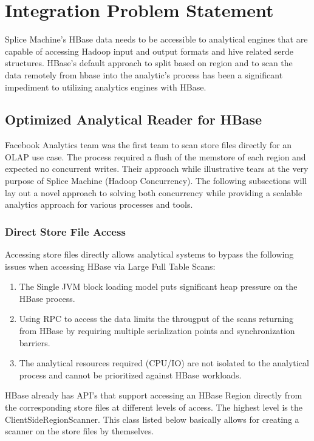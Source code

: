 \section{Integration Problem Statement}
Splice Machine's HBase data needs to be accessible to analytical engines that are capable of accessing
Hadoop input and output formats and hive related serde structures.  HBase's
default approach to split based on region and to scan the data remotely from
hbase into the analytic's process has been a significant impediment to utilizing
analytics engines with HBase.

\subsection{Optimized Analytical Reader for HBase}
Facebook Analytics team was the first team to scan store files directly for an
OLAP use case.  The process required a flush of the memstore of each region and
expected no concurrent writes.  Their approach while illustrative tears at the
very purpose of Splice Machine (Hadoop Concurrency).  The following subsections
will lay out a novel approach to solving both concurrency while providing a
scalable analytics approach for various processes and tools.


\subsubsection{Direct Store File Access}
Accessing store files directly allows analytical systems to bypass the following
issues when accessing HBase via Large Full Table Scans:

\begin{enumerate}
	\item The Single JVM block loading model puts significant heap pressure on the
	HBase process.
	\item Using RPC to access the data limits the througput of the scans returning
	from HBase by requiring multiple serialization points and 
	synchronization barriers.
	\item The analytical resources required (CPU/IO) are not isolated to the
	analytical process and cannot be prioritized against HBase workloads.
\end{enumerate}


HBase already has API's that support accessing an HBase Region
directly from the corresponding store files at different levels of access.  The
highest level is the ClientSideRegionScanner.  This class listed below basically
allows for creating a scanner on the store files by themselves.

